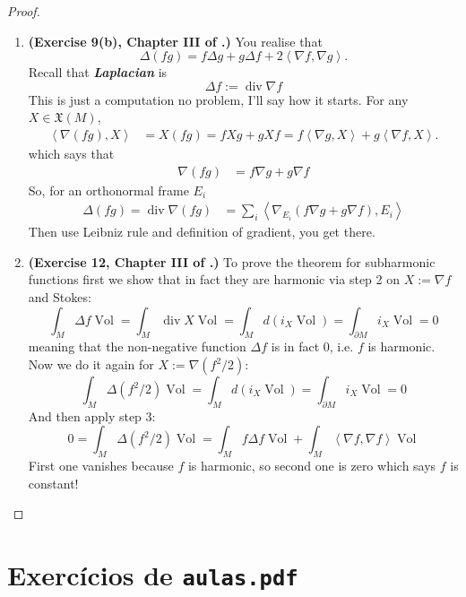 \begin{proof}
\begin{enumerate}[label=\textbf{Step \arabic*}]
	\item \textbf{(Exercise 9(b), Chapter III of  \cite{doc}.)} You realise that
	\[\Delta(fg)=f \Delta g + g \Delta f+2\left<\nabla f,\nabla g\right>.\]
	Recall that \textit{\textbf{Laplacian}} is
	\[\Delta f:=\operatorname{div} \nabla f\]
	This is just a computation no problem, I'll say how it starts. For any \(X \in \mathfrak{X}(M)\),
	\begin{align*}
	\left<\nabla(fg),X\right>&=X(fg)=fXg+gXf=f\left<\nabla g,X\right>+g\left<\nabla f,X\right>.
	\end{align*}
	which says that	\begin{align*}\nabla(fg)&=f \nabla g+g \nabla f\end{align*}
	So, for an orthonormal frame \(E_i\)
	\begin{align*}\Delta(fg)=\operatorname{div} \nabla(fg)&=\sum_i\left<\nabla_{E_i}(f \nabla g+g \nabla f),E_i\right>
	\end{align*}
	Then use Leibniz rule and definition of gradient, you get there.
	
\item \textbf{(Exercise 12, Chapter III of  \cite{doc}.)} To prove the theorem for subharmonic functions first we show that in fact they are harmonic via step 2 on \(X:= \nabla f\) and Stokes:
	\[\int_M \Delta f \operatorname{Vol}=\int_M \operatorname{div}X \operatorname{Vol}=\int_M d(i_X \operatorname{Vol})=\int_{\partial M}i_X \operatorname{Vol}=0\]
meaning that the non-negative function \(\Delta f\) is in fact 0, i.e. \(f\) is harmonic. Now we do it again for \(X:=\nabla(f^2/2)\):
	\[\int_M \Delta(f^2/2)\operatorname{Vol}=\int_M d(i_X \operatorname{Vol})=\int_{\partial M}i_X \operatorname{Vol}=0\]
	And then apply step 3:
	\[0=\int_M \Delta(f^2/2)\operatorname{Vol}=\int_M f \Delta f \operatorname{Vol}+\int_M \left<\nabla f,\nabla f\right>\operatorname{Vol}\]
First one vanishes because \(f\) is harmonic, so second one is zero which says \(f\) is constant!
\end{enumerate}
\end{proof}



\section{Exercícios de \texttt{aulas.pdf}}
